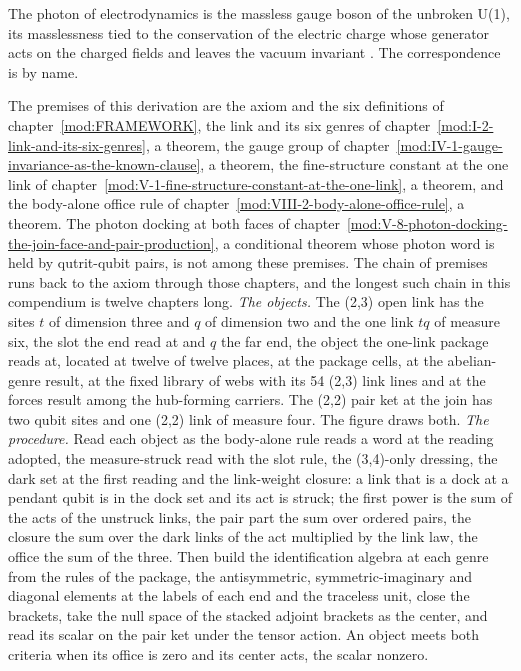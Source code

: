 \begin{chbridge}
The photon of electrodynamics is the massless gauge boson of the unbroken U(1), its masslessness tied to the conservation of the electric charge whose generator acts on the charged fields and leaves the vacuum invariant \cite{Peskin1995,Weinberg1995}. The correspondence is by name.
\end{chbridge}
\begin{chproof}
The premises of this derivation are the axiom and the six definitions of chapter~\ref{mod:FRAMEWORK}, the link and its six genres of chapter~\ref{mod:I-2-link-and-its-six-genres}, a theorem, the gauge group of chapter~\ref{mod:IV-1-gauge-invariance-as-the-known-clause}, a theorem, the fine-structure constant at the one link of chapter~\ref{mod:V-1-fine-structure-constant-at-the-one-link}, a theorem, and the body-alone office rule of chapter~\ref{mod:VIII-2-body-alone-office-rule}, a theorem. The photon docking at both faces of chapter~\ref{mod:V-8-photon-docking-the-join-face-and-pair-production}, a conditional theorem whose photon word is held by qutrit-qubit pairs, is not among these premises. The chain of premises runs back to the axiom through those chapters, and the longest such chain in this compendium is twelve chapters long.
\textit{The objects.} The (2,3) open link has the sites $t$ of dimension three and $q$ of dimension two and the one link $tq$ of measure six, the slot the end read at and $q$ the far end, the object the one-link package reads at, located at twelve of twelve places, at the package cells, at the abelian-genre result, at the fixed library of webs with its 54 (2,3) link lines and at the forces result among the hub-forming carriers. The (2,2) pair ket at the join has two qubit sites and one (2,2) link of measure four. The figure draws both.
\textit{The procedure.} Read each object as the body-alone rule reads a word at the reading adopted, the measure-struck read with the slot rule, the (3,4)-only dressing, the dark set at the first reading and the link-weight closure: a link that is a dock at a pendant qubit is in the dock set and its act is struck; the first power is the sum of the acts of the unstruck links, the pair part the sum over ordered pairs, the closure the sum over the dark links of the act multiplied by the link law, the office the sum of the three. Then build the identification algebra at each genre from the rules of the package, the antisymmetric, symmetric-imaginary and diagonal elements at the labels of each end and the traceless unit, close the brackets, take the null space of the stacked adjoint brackets as the center, and read its scalar on the pair ket under the tensor action. An object meets both criteria when its office is zero and its center acts, the scalar nonzero.

\end{chproof}
